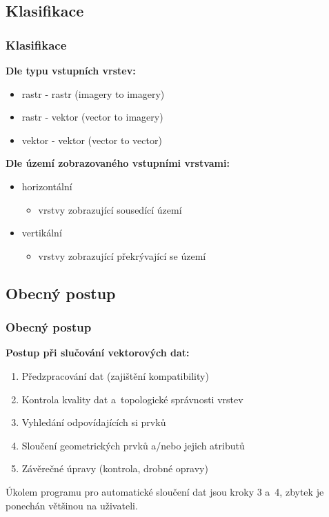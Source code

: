 \documentclass[unicode,bookmarksnumbered]{beamer}
\begin{document}
  \subsection{Klasifikace} %
  \begin{frame}
  \frametitle{Klasifikace} %
    \textbf{Dle typu vstupních vrstev:}
     \begin{itemize}
      \item rastr - rastr (imagery to imagery)
      \item rastr - vektor (vector to imagery)
      \item \textcolor{red!70!black}{vektor - vektor} (vector to vector)
     \end{itemize}
    \textbf{Dle území zobrazovaného vstupními vrstvami:}
     \begin{itemize}
      \item horizontální
        \begin{itemize}
         \item vrstvy zobrazující sousedící území
        \end{itemize}
      \item vertikální
        \begin{itemize}
         \item vrstvy zobrazující překrývající se území
        \end{itemize}
     \end{itemize}
  \end{frame}

  \subsection{Obecný postup}
  \begin{frame}
  \frametitle{Obecný postup}   %
     \textbf{Postup při slučování vektorových dat:}
     \begin{enumerate}
      \item Předzpracování dat (zajištění kompatibility)
      \item Kontrola kvality dat a~topologické správnosti vrstev
      \item Vyhledání odpovídajících si prvků
      \item Sloučení geometrických prvků a/nebo jejich atributů
      \item Závěrečné úpravy (kontrola, drobné opravy)
     \end{enumerate}
      \pause[]
     Úkolem programu pro automatické sloučení dat jsou kroky 3 a~4,
     zbytek je ponechán většinou na uživateli.
  \end{frame}
\end{document}
